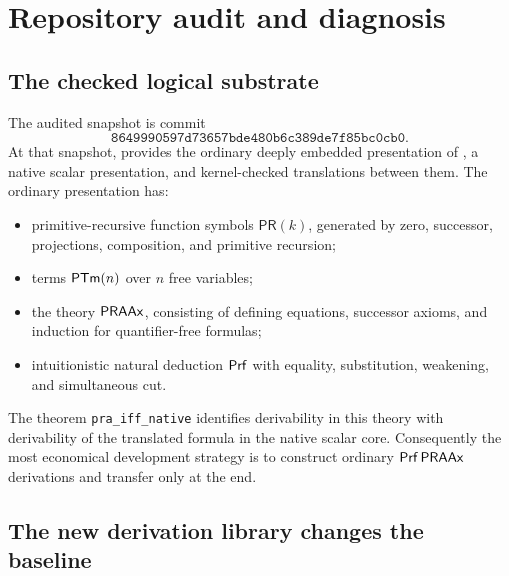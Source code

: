 \section{Repository audit and diagnosis}\label{sec:audit}

\subsection{The checked logical substrate}

The audited snapshot is commit
\[
\texttt{8649990597d73657bde480b6c389de7f85bc0cb0}.
\]
At that snapshot,  provides the ordinary deeply embedded presentation of \iPRA, a native scalar presentation, and kernel-checked translations between them.  The ordinary presentation has:
\begin{itemize}
  \item primitive-recursive function symbols \(\mathsf{PR}(k)\), generated by zero, successor, projections, composition, and primitive recursion;
  \item terms \(\mathsf{PTm}(n)\) over \(n\) free variables;
  \item the theory \(\mathsf{PRAAx}\), consisting of defining equations, successor axioms, and induction for quantifier-free formulas;
  \item intuitionistic natural deduction \(\mathsf{Prf}\) with equality, substitution, weakening, and simultaneous cut.
\end{itemize}
The theorem \texttt{pra\_iff\_native} identifies derivability in this theory with derivability of the translated formula in the native scalar core.  Consequently the most economical development strategy is to construct ordinary \(\mathsf{Prf}\,\mathsf{PRAAx}\) derivations and transfer only at the end.

\subsection{The new derivation library changes the baseline}

